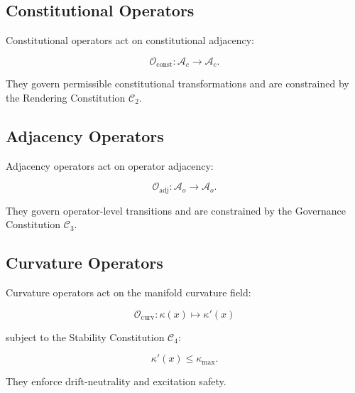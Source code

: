
\subsection{Constitutional Operators}

Constitutional operators act on constitutional adjacency:

\[
\mathcal{O}_{\mathrm{const}} :
\mathcal{A}_c \to \mathcal{A}_c.
\]

They govern permissible constitutional transformations and are constrained
by the Rendering Constitution $\mathcal{C}_2$.


\subsection{Adjacency Operators}

Adjacency operators act on operator adjacency:

\[
\mathcal{O}_{\mathrm{adj}} :
\mathcal{A}_o \to \mathcal{A}_o.
\]

They govern operator-level transitions and are constrained by the Governance
Constitution $\mathcal{C}_3$.


\subsection{Curvature Operators}

Curvature operators act on the manifold curvature field:

\[
\mathcal{O}_{\mathrm{curv}} : \kappa(x) \mapsto \kappa'(x)
\]

subject to the Stability Constitution $\mathcal{C}_4$:

\[
\kappa'(x) \le \kappa_{\max}.
\]

They enforce drift-neutrality and excitation safety.


